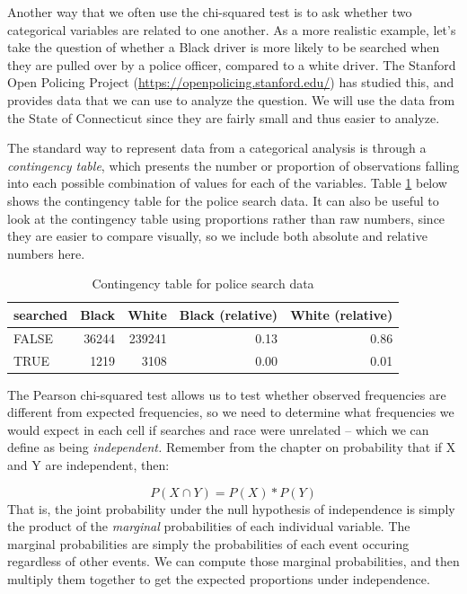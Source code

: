 \documentclass[
  12pt,
]{book}
\begin{document}
Another way that we often use the chi-squared test is to ask whether two categorical variables are related to one another. As a more realistic example, let's take the question of whether a Black driver is more likely to be searched when they are pulled over by a police officer, compared to a white driver. The Stanford Open Policing Project (\url{https://openpolicing.stanford.edu/}) has studied this, and provides data that we can use to analyze the question. We will use the data from the State of Connecticut since they are fairly small and thus easier to analyze.

The standard way to represent data from a categorical analysis is through a \emph{contingency table}, which presents the number or proportion of observations falling into each possible combination of values for each of the variables. Table \ref{tab:policeCT} below shows the contingency table for the police search data. It can also be useful to look at the contingency table using proportions rather than raw numbers, since they are easier to compare visually, so we include both absolute and relative numbers here.

\begin{table}

\caption{\label{tab:policeCT}Contingency table for police search data}
\centering
\begin{tabular}[t]{l|r|r|r|r}
\hline
searched & Black & White & Black (relative) & White (relative)\\
\hline
FALSE & 36244 & 239241 & 0.13 & 0.86\\
\hline
TRUE & 1219 & 3108 & 0.00 & 0.01\\
\hline
\end{tabular}
\end{table}

The Pearson chi-squared test allows us to test whether observed frequencies are different from expected frequencies, so we need to determine what frequencies we would expect in each cell if searches and race were unrelated -- which we can define as being \emph{independent.} Remember from the chapter on probability that if X and Y are independent, then:

\[
P(X \cap Y) = P(X) * P(Y)
\]
That is, the joint probability under the null hypothesis of independence is simply the product of the \emph{marginal} probabilities of each individual variable. The marginal probabilities are simply the probabilities of each event occuring regardless of other events. We can compute those marginal probabilities, and then multiply them together to get the expected proportions under independence.
\end{document}
